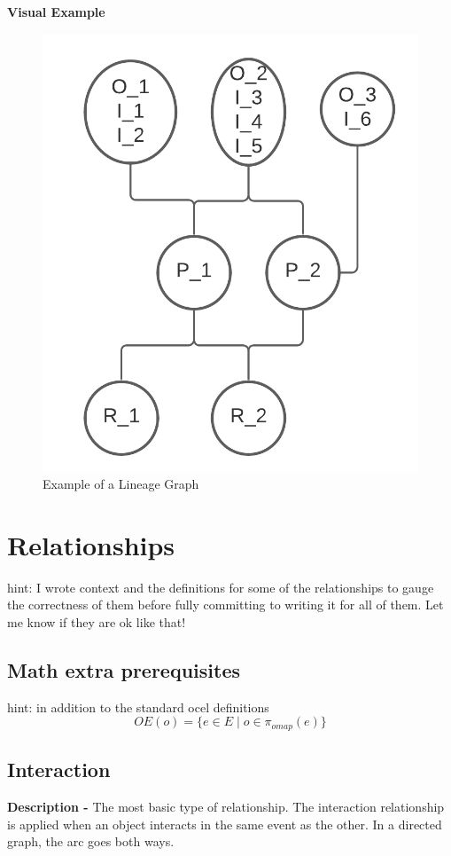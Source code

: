 \documentclass{article}
\begin{document}
\noindent\textbf{Visual Example}
\begin{figure}[h]
	\centering
	\includegraphics[scale=0.8]{images/lineage.png}
	\caption{Example of a Lineage Graph}
	\label{fig:lineage}
\end{figure}

\section{Relationships}
hint: I wrote context and the definitions for some of the relationships to gauge the correctness of them before fully committing to writing it for all of them. Let me know if they are ok like that!
\subsection{Math extra prerequisites}
hint: in addition to the standard ocel definitions
$$OE(o) = \{ e \in E \mid o \in \pi_{omap}(e) \}$$
\subsection{Interaction}
\noindent\textbf{Description -} The most basic type of relationship. The interaction relationship is applied when an object interacts in the same event as the other. In a directed graph, the arc goes both ways. \\
\end{document}
